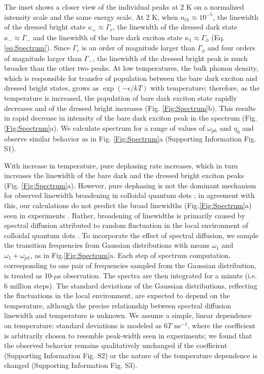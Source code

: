 \documentclass[aps,pra,preprint,groupedaddress]{revtex4-1}
\begin{document}
The inset shows a closer view of the individual peaks at 2 K on a normalized intensity scale and the same energy scale. At 2 K, when $n_{th} \approx 10^{-5}$, the linewidth of the dressed bright state $\kappa_+ \approx \Gamma_r$, the linewidth of the dressed dark state $\kappa_- \approx \Gamma_{-}$ and the linewidth of the bare dark exciton state $\kappa_1 \approx \Gamma_{\phi}$ (Eq. \ref{eq:Spectrum}). Since $\Gamma_r$ is an order of magnitude larger than $\Gamma_{\phi}$ and four orders of magnitude larger than $\Gamma_{-}$, the linewidth of the dressed bright peak is much broader than the other two peaks. At low temperatures, the bulk phonon density, which is responsible for transfer of population between the bare dark exciton and dressed bright states, grows as $\exp{(-\epsilon/kT)}$ with temperature; therefore, as the temperature is increased, the population of bare dark exciton state rapidly decreases and of the dressed bright increases (Fig. \ref{Fig:Spectrum}b). This results in rapid decrease in intensity of the bare dark exciton peak in the spectrum (Fig.\ref{Fig:Spectrum}a). We calculate spectrum for a range of values of $\omega_{ph}$ and $\eta_0$ and observe similar behavior as in Fig. \ref{Fig:Spectrum}a (Supporting Information Fig. S1).

With increase in temperature, pure dephasing rate increases, which in turn increases the linewidth of the bare dark and the dressed bright exciton peaks (Fig. \ref{Fig:Spectrum}a). However, pure dephasing is not the dominant mechanism for observed linewidth broadening in colloidal quantum dots \cite{Empedocles1999}; in agreement with this, our calculations do not predict the broad linewidths (Fig.\ref{Fig:Spectrum}a) seen in experiments \cite{Biadala2009}. Rather, broadening of linewidths is primarily caused by spectral diffusion attributed to random fluctuation in the local environment of colloidal quantum dots \cite{Blanton1996,Empedocles1999,Neuhauser2000,Palinginis2003, Biadala2009,Sallen2010}. To incorporate the effect of spectral diffusion, we sample the transition frequencies from Gaussian distributions with means $\omega_1$ and $\omega_1 + \omega_{ph}$, as in Fig.\ref{Fig:Spectrum}a. Each step of spectrum computation, corresponding to one pair of frequencies sampled from the Gaussian distribution, is treated as 10-$\mu$s observation. The spectra are then integrated for a minute (i.e. 6 million steps). The standard deviations of the Gaussian distributions, reflecting the fluctuations in the local environment, are expected to depend on the temperature, although the precise relationship between spectral diffusion linewidth and temperature is unknown. We assume a simple, linear dependence on temperature: standard deviations is modeled as  6$T$ ns$^{-1}$, where the coefficient is arbitrarily chosen to resemble peak-width seen in experiments; we found that the observed behavior remains qualitatively unchanged if the coefficient (Supporting Information Fig. S2) or the nature of the temperature dependence is changed (Supporting Information Fig. S3). 
\end{document}
